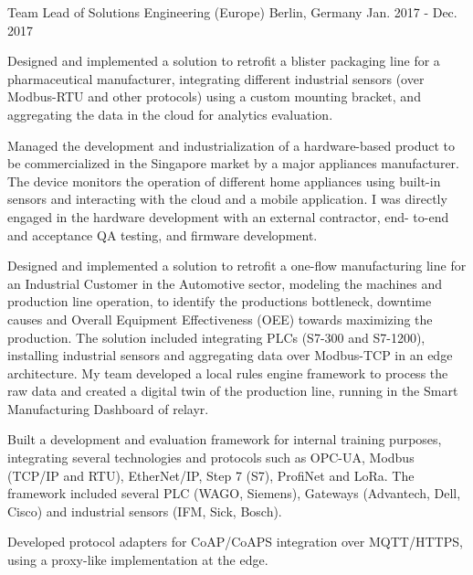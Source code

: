 \begin{cventries}
  \cventry
    {Team Lead of Solutions Engineering (Europe)} %
    {} %
    {Berlin, Germany} %
    {Jan. 2017 - Dec. 2017} %
    {
      \begin{cvitems} %
        \item {Designed and implemented a solution to retrofit a blister packaging line for a pharmaceutical manufacturer, integrating different industrial sensors (over Modbus-RTU and other protocols) using a custom mounting bracket, and aggregating the data in the cloud for analytics evaluation.}
        \item {Managed the development and industrialization of a hardware-based product to be commercialized in the Singapore market by a major appliances manufacturer. The device monitors the operation of different home appliances using built-in sensors and interacting with the cloud and a mobile application. I was directly engaged in the hardware development with an external contractor, end- to-end and acceptance QA testing, and firmware development.}
        \item {Designed and implemented a solution to retrofit a one-flow manufacturing line for an Industrial Customer in the Automotive sector, modeling the machines and production line operation, to identify the productions bottleneck, downtime causes and Overall Equipment Effectiveness (OEE) towards maximizing the production. The solution included integrating  PLCs (S7-300 and S7-1200), installing industrial sensors and aggregating data over Modbus-TCP in an edge architecture.  My team developed a local rules engine framework to process the raw data and created a digital twin of the production line, running in the Smart Manufacturing Dashboard of relayr.}
        \item {Built a development and evaluation framework for internal training purposes, integrating several technologies and protocols such as OPC-UA, Modbus (TCP/IP and RTU), EtherNet/IP, Step 7 (S7), ProfiNet and LoRa. The framework included several PLC (WAGO, Siemens), Gateways (Advantech, Dell, Cisco) and industrial sensors (IFM, Sick, Bosch).}
        \item {Developed protocol adapters for CoAP/CoAPS integration over MQTT/HTTPS, using a proxy-like implementation at the edge.}
      \end{cvitems}
    }


  \cventry %
    {}
    {}
    {}
    {}
    {}

\end{cventries}

